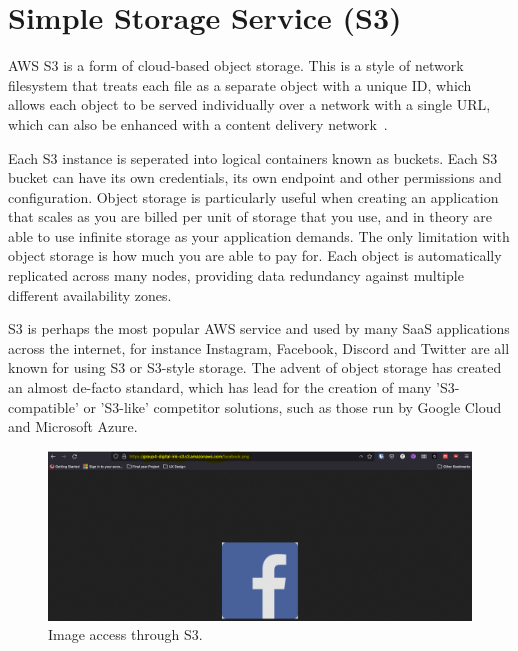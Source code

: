 \chapter{Simple Storage Service (S3)}\label{ch:simple-storage-service}

AWS S3 is a form of cloud-based object storage.
This is a style of network filesystem that treats each file as a separate object with a unique ID, which allows each
object to be served individually over a network with a single URL, which can also be enhanced with a content delivery
network~\parencite{amazon2022cloud}.

Each S3 instance is seperated into logical containers known as buckets.
Each S3 bucket can have its own credentials, its own endpoint and other permissions and configuration.
Object storage is particularly useful when creating an application that scales as you are billed per unit of storage
that you use, and in theory are able to use infinite storage as your application demands.
The only limitation with object storage is how much you are able to pay for.
Each object is automatically replicated across many nodes, providing data redundancy against multiple different
availability zones.

S3 is perhaps the most popular AWS service and used by many SaaS applications across the internet, for instance
Instagram, Facebook, Discord and Twitter are all known for using S3 or S3-style storage.
The advent of object storage has created an almost de-facto standard, which has lead for the creation of many
'S3-compatible' or 'S3-like' competitor solutions, such as those run by Google Cloud and Microsoft Azure.

\begin{figure}
    \centering
    \includegraphics[width=\textwidth]{resources/s3/s3-image-displayed}
    \caption{Image access through S3.}
    \label{fig:s3-image}
\end{figure}